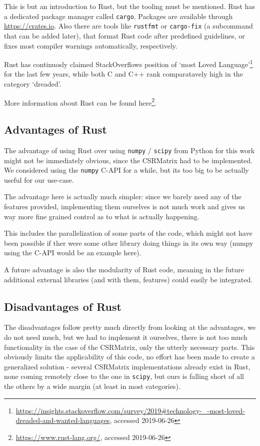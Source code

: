 This is but an introduction to Rust, but the tooling must be mentioned. Rust
has a dedicated package manager called \verb|cargo|. Packages are available
through \url{https://crates.io}. Also there are tools like \verb|rustfmt| or
\verb|cargo-fix| (a subcommand that can be added later), that format Rust code
after predefined guidelines, or fixes most compiler warnings automatically,
respectively.

Rust has continuosly claimed StackOverflows position of `most Loved
Language'\footnote{\url{https://insights.stackoverflow.com/survey/2019\#technology-\_-most-loved-dreaded-and-wanted-languages}, accessed 2019-06-26}
for the last few years, while both C and C++ rank comparatavely high in the
category `dreaded'.

More information about Rust can be found here\footnote{\url{https://www.rust-lang.org/}, accessed 2019-06-26}.


\subsection{Advantages of Rust}

The advantage of using Rust over using \verb|numpy| / \verb|scipy| from Python
for this work might not be immediately obvious, since the CSRMatrix had to be
implemented. We considered using the \verb|numpy| C-API for a while, but its
too big to be actually useful for our use-case.

The advantage here is actually much simpler: since we barely need any of the
features provided, implementing them ourselves is not much work and gives us
way more fine grained control as to what is actually happening.

This includes the parallelization of some parts of the code, which might not
have been possible if ther were some other library doing things in its own way
(numpy using the C-API would be an example here).

A future advantage is also the modularity of Rust code, meaning in the future
additional external libraries (and with them, features) could easily be integrated.

\subsection{Disadvantages of Rust}

The disadvantages follow pretty much directly from looking at the advantages,
we do not need much, but we had to implement it ourselves, there is not
too much functionality in the case of the CSRMatrix, only the utterly necessary
parts. This obviously limits the applicability of this code, no effort has been
made to create a generalized solution - several CSRMatrix implementations
already exist in Rust, none coming remotely close to the one in \verb|scipy|,
but ours is falling short of all the others by a wide margin (at least in most
categories).



